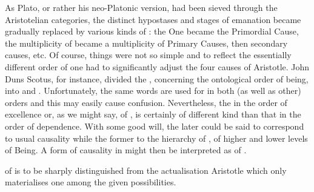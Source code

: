  \pa\label{pa:foundingCausing} As Plato, or rather
his neo-Platonic version, had been sieved through the Aristotelian categories, the
distinct hypostases and stages of emanation became gradually replaced by various
kinds of : the One became the Primordial Cause, the multiplicity of
 became a multiplicity of Primary Causes, then secondary causes,
etc. Of course, things were not so simple and to reflect the essentially
different order of  one had to significantly adjust the four causes
of Aristotle.  John Duns Scotus, for instance, divided the ,
concerning the ontological order of being, into  and
.
Unfortunately, the same words are used for  in both (as well as
other) orders and this may easily cause confusion. Nevertheless, the
 in the order of excellence or, as we might say, of
, is certainly of different kind than that in the order of
dependence.  With some good will, the later could be said to correspond to usual
causality while the former to the hierarchy of , of higher and
lower levels of Being.  A form of causality in  might then
be interpreted as  of .
%

\pa\label{pa:contActVirt}  of  is to be sharply
distinguished from the actualisation  Aristotle which only
materialises one among the given possibilities.


